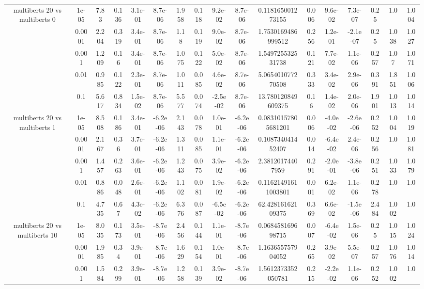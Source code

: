 \begin{tabular}{|c|c|c|c|c|c|c|c|c|c|c|c|c|c|c|c|c|}
\hline
\multirow{5}{*}{multiberts 20 vs multiberts 0} & 1e-05 & 7.83 & 0.136 & 3.1e-01 & 8.7e-06 & 1.958 & 0.118 & 9.2e-02 & 8.7e-06 & 0.118165001273155 & 0.006 & 9.6e-02 & 7.3e-07 & 0.25 & 1.0 & 1.004 \\
 & 0.0001 & 2.204 & 0.319 & 3.4e-01 & 8.7e-06 & 1.18 & 0.119 & 9.0e-02 & 8.7e-06 & 1.7530169486999512 & 0.256 & 1.2e-01 & -2.1e-07 & 0.25 & 1.038 & 1.027 \\
 & 0.001 & 1.209 & 0.16 & 3.4e-01 & 8.7e-06 & 1.075 & 0.122 & 5.0e-02 & 8.7e-06 & 1.549725532531738 & 0.121 & 7.7e-02 & 1.1e-06 & 0.257 & 1.07 & 1.071 \\
 & 0.01 & 0.985 & 0.122 & 2.3e-01 & 8.7e-06 & 1.011 & 0.085 & 4.6e-02 & 8.7e-06 & 5.065401077270508 & 0.333 & 3.4e-02 & 2.9e-06 & 0.391 & 1.851 & 1.006 \\
 & 0.1 & 5.617 & 0.834 & 1.5e-02 & 8.7e-06 & 5.577 & 0.074 & -2.5e-02 & 8.7e-06 & 13.780120849609375 & 0.16 & 1.4e-02 & 2.0e-06 & 1.901 & 1.013 & 1.014 \\
\hline
\multirow{5}{*}{multiberts 20 vs multiberts 1} & 1e-05 & 8.508 & 0.186 & 3.4e-01 & -6.2e-06 & 2.143 & 0.078 & 1.0e-01 & -6.2e-06 & 0.08310157805681201 & 0.006 & -4.0e-02 & -2.6e-06 & 0.252 & 1.004 & 1.019 \\
 & 0.0001 & 2.167 & 0.36 & 3.7e-01 & -6.2e-06 & 1.311 & 0.085 & 1.1e-01 & -6.2e-06 & 0.108734041452407 & 0.014 & -6.4e-02 & 2.4e-06 & 0.256 & 1.0 & 1.081 \\
 & 0.001 & 1.457 & 0.263 & 3.6e-01 & -6.2e-06 & 1.243 & 0.075 & 3.9e-02 & -6.2e-06 & 2.38120174407959 & 0.291 & -2.0e-01 & -3.8e-06 & 0.251 & 1.033 & 1.079 \\
 & 0.01 & 0.886 & 0.048 & 2.6e-01 & -6.2e-06 & 1.102 & 0.081 & 1.9e-02 & -6.2e-06 & 0.11621491611003801 & 0.001 & 6.2e-02 & 1.1e-06 & 0.278 & 1.0 & 1.0 \\
 & 0.1 & 4.735 & 0.67 & 4.3e-02 & -6.2e-06 & 6.376 & 0.087 & -6.5e-02 & -6.2e-06 & 62.42816162109375 & 0.369 & 6.6e-02 & -1.5e-06 & 2.484 & 1.002 & 1.0 \\
\hline
\multirow{5}{*}{multiberts 20 vs multiberts 10} & 1e-05 & 8.035 & 0.173 & 3.5e-01 & -8.7e-06 & 2.456 & 0.144 & 1.1e-01 & -8.7e-06 & 0.068458169698715 & 0.007 & -6.4e-02 & 1.5e-06 & 0.25 & 1.015 & 1.024 \\
 & 0.0001 & 1.985 & 0.34 & 3.9e-01 & -8.7e-06 & 1.629 & 0.154 & 1.0e-01 & -8.7e-06 & 1.163655757904052 & 0.265 & 3.9e-02 & 5.5e-07 & 0.257 & 1.076 & 1.014 \\
 & 0.001 & 1.584 & 0.299 & 3.9e-01 & -8.7e-06 & 1.258 & 0.139 & 3.9e-02 & -8.7e-06 & 1.5612373352050781 & 0.215 & -2.2e-02 & 1.1e-06 & 0.252 & 1.002 & 1.0 \\

\end{tabular}
